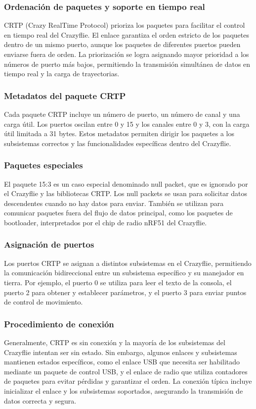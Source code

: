 \subsubsection*{Ordenación de paquetes y soporte en tiempo real}
CRTP (Crazy RealTime Protocol) prioriza los paquetes para facilitar el control en tiempo real del Crazyflie. El enlace garantiza el orden estricto de los paquetes dentro de un mismo puerto, aunque los paquetes de diferentes puertos pueden enviarse fuera de orden. La priorización se logra asignando mayor prioridad a los números de puerto más bajos, permitiendo la transmisión simultánea de datos en tiempo real y la carga de trayectorias.

\subsubsection*{Metadatos del paquete CRTP}
Cada paquete CRTP incluye un número de puerto, un número de canal y una carga útil. Los puertos oscilan entre 0 y 15 y los canales entre 0 y 3, con la carga útil limitada a 31 bytes. Estos metadatos permiten dirigir los paquetes a los subsistemas correctos y las funcionalidades específicas dentro del Crazyflie.

\subsubsection*{Paquetes especiales}
El paquete 15:3 es un caso especial denominado null packet, que es ignorado por el Crazyflie y las bibliotecas CRTP. Los null packets se usan para solicitar datos descendentes cuando no hay datos para enviar. También se utilizan para comunicar paquetes fuera del flujo de datos principal, como los paquetes de bootloader, interpretados por el chip de radio nRF51 del Crazyflie.

\subsubsection*{Asignación de puertos}
Los puertos CRTP se asignan a distintos subsistemas en el Crazyflie, permitiendo la comunicación bidireccional entre un subsistema específico y su manejador en tierra. Por ejemplo, el puerto 0 se utiliza para leer el texto de la consola, el puerto 2 para obtener y establecer parámetros, y el puerto 3 para enviar puntos de control de movimiento.

\subsubsection*{Procedimiento de conexión}
Generalmente, CRTP es sin conexión y la mayoría de los subsistemas del Crazyflie intentan ser sin estado. Sin embargo, algunos enlaces y subsistemas mantienen estados específicos, como el enlace USB que necesita ser habilitado mediante un paquete de control USB, y el enlace de radio que utiliza contadores de paquetes para evitar pérdidas y garantizar el orden. La conexión típica incluye inicializar el enlace y los subsistemas soportados, asegurando la transmisión de datos correcta y segura.